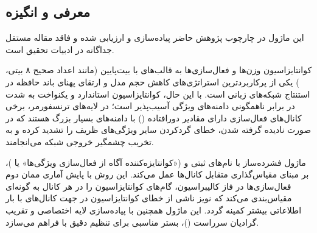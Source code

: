 \subsection{معرفی و انگیزه}
این ماژول در چارچوب پژوهش حاضر پیاده‌سازی و ارزیابی شده و فاقد مقاله مستقل جداگانه در ادبیات تحقیق است.

کوانتایزاسیون وزن‌ها و فعال‌سازی‌ها به قالب‌های با بیت‌پایین (مانند اعداد صحیح ۸ بیتی، ) یکی از پرکاربردترین استراتژی‌های کاهش حجم مدل و ارتقای پهنای باند حافظه در استنتاج شبکه‌های زبانی است. با این حال، کوانتایزاسیون استاندارد و یکنواخت به شدت در برابر ناهمگونی دامنه‌های ویژگی آسیب‌پذیر است؛ در لایه‌های ترنسفورمر، برخی کانال‌های فعال‌سازی دارای مقادیر دورافتاده () با دامنه‌های بسیار بزرگ هستند که در صورت نادیده گرفته شدن، خطای گردکردن سایر ویژگی‌های ظریف را تشدید کرده و به تخریب چشمگیر خروجی شبکه می‌انجامند.

ماژول فشرده‌ساز  با نام‌های ثبتی  و  («کوانتایزه‌کننده آگاه از فعال‌سازی ویژگی‌ها» یا )، بر مبنای مقیاس‌گذاری متقابل کانال‌ها عمل می‌کند. این روش با پایش آماری ممان دوم فعال‌سازی‌ها در فاز کالیبراسیون، گام‌های کوانتایزاسیون را در هر کانال به گونه‌ای مقیاس‌بندی می‌کند که نویز ناشی از خطای کوانتایزاسیون در جهت کانال‌های با بار اطلاعاتی بیشتر کمینه گردد. این ماژول همچنین با پیاده‌سازی لایه اختصاصی  و تقریب گرادیان سرراست ()، بستر مناسبی برای تنظیم دقیق با  فراهم می‌سازد.
